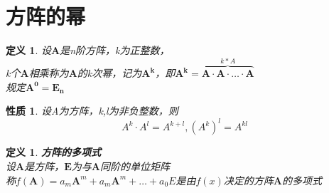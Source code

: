 \documentclass[12pt,oneside]{ctexbook}
\newtheorem{definition}[subsection]{定义}
\newtheorem{property}[subsection]{性质}
\begin{document}
\section{方阵的幂}
\begin{definition}
    设\(\mathbf{A}\)是n阶方阵，k为正整数，
    \\k个\(\mathbf{A}\)相乘称为\(\mathbf{A}\)的k次幂，记为\(\mathbf{A^k}\)，即\(\mathbf{A^k}= \overbrace{\mathbf{A}\cdot \mathbf{A}\cdot \dots \cdot \mathbf{A}}^{k*A} \)
    \\规定\(\mathbf{A^0}=\mathbf{E_n}\)    
\end{definition}
\begin{property}
    设A为方阵，k,l为非负整数，则
    \[A^k \cdot A^l=A^{k+l} , (A^k)^l=A^{kl}\]
\end{property}
\begin{definition}
    \textbf{方阵的多项式}
    \\ 设\(\mathbf{A}\)是方阵，\(\mathbf{E}\)为与\(\mathbf{A}\)同阶的单位矩阵 \\
    称\(f(\mathbf{A})=a_m\mathbf{A}^m+a_m\mathbf{A}^m+ \dots + a_0E\)是由\(f(x)\)决定的方阵\(\mathbf{A}\)的多项式
\end{definition}
\end{document}
